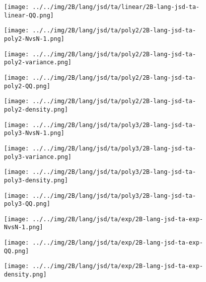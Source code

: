 \begin{figure}[H]
\centering	\texttt{[image: ../../img/2B/lang/jsd/ta/linear/2B-lang-jsd-ta-linear-QQ.png]}
\end{figure}
\begin{figure}[H]
\centering	\texttt{[image: ../../img/2B/lang/jsd/ta/poly2/2B-lang-jsd-ta-poly2-NvsN-1.png]}
\end{figure}
\begin{figure}[H]
\centering	\texttt{[image: ../../img/2B/lang/jsd/ta/poly2/2B-lang-jsd-ta-poly2-variance.png]}
\end{figure}
\begin{figure}[H]
\centering	\texttt{[image: ../../img/2B/lang/jsd/ta/poly2/2B-lang-jsd-ta-poly2-QQ.png]}
\end{figure}
\begin{figure}[H]
\centering	\texttt{[image: ../../img/2B/lang/jsd/ta/poly2/2B-lang-jsd-ta-poly2-density.png]}
\end{figure}
\begin{figure}[H]
\centering	\texttt{[image: ../../img/2B/lang/jsd/ta/poly3/2B-lang-jsd-ta-poly3-NvsN-1.png]}
\end{figure}
\begin{figure}[H]
\centering	\texttt{[image: ../../img/2B/lang/jsd/ta/poly3/2B-lang-jsd-ta-poly3-variance.png]}
\end{figure}
\begin{figure}[H]
\centering	\texttt{[image: ../../img/2B/lang/jsd/ta/poly3/2B-lang-jsd-ta-poly3-density.png]}
\end{figure}
\begin{figure}[H]
\centering	\texttt{[image: ../../img/2B/lang/jsd/ta/poly3/2B-lang-jsd-ta-poly3-QQ.png]}
\end{figure}
\begin{figure}[H]
\centering	\texttt{[image: ../../img/2B/lang/jsd/ta/exp/2B-lang-jsd-ta-exp-NvsN-1.png]}
\end{figure}
\begin{figure}[H]
\centering	\texttt{[image: ../../img/2B/lang/jsd/ta/exp/2B-lang-jsd-ta-exp-QQ.png]}
\end{figure}
\begin{figure}[H]
\centering	\texttt{[image: ../../img/2B/lang/jsd/ta/exp/2B-lang-jsd-ta-exp-density.png]}
\end{figure}
